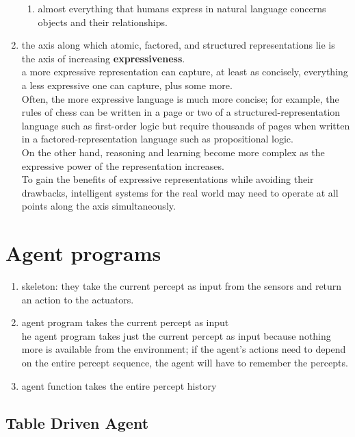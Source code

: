 \begin{enumerate}
\begin{enumerate}
        \item almost everything that humans express in natural language concerns objects and their relationships.
    \end{enumerate}

    \item  the axis along which atomic, factored, and structured representations lie is the axis of increasing \textbf{expressiveness}.\\
    a more expressive representation can capture, at least as concisely, everything a less expressive one can capture, plus some more.\\
    Often, the more expressive language is much more concise; for example, the rules of chess can be written in a page or two of a structured-representation language such as first-order logic but require thousands of pages when written in a factored-representation language such as propositional logic.\\
    On the other hand, reasoning and learning become more complex as the expressive power of the representation increases.\\
    To gain the benefits of expressive representations while avoiding their drawbacks, intelligent systems for the real world may need to operate at all points along the axis simultaneously.
\end{enumerate}

\section{Agent programs \cite{aci-1}}

\begin{enumerate}
    \item skeleton: they take the current percept as input from the sensors and return an action to the actuators. 
    
    \item agent program takes the current percept as input\\
    he agent program takes just the current percept as input because nothing more is available from the environment; if the agent’s actions need to depend on the entire percept sequence, the agent will have to remember the percepts.

    \item agent function takes the entire percept history
\end{enumerate}

\subsection{Table Driven Agent \cite{aci-1}}

